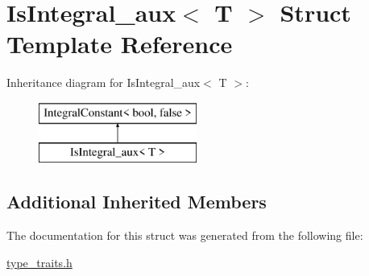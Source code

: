 \hypertarget{struct_is_integral__aux}{}\section{Is\+Integral\+\_\+aux$<$ T $>$ Struct Template Reference}
\label{struct_is_integral__aux}
Inheritance diagram for Is\+Integral\+\_\+aux$<$ T $>$\+:\begin{figure}[H]
\begin{center}
\leavevmode
\includegraphics[height=2.000000cm]{struct_is_integral__aux}
\end{center}
\end{figure}
\subsection*{Additional Inherited Members}


The documentation for this struct was generated from the following file\+:\begin{DoxyCompactItemize}
\item 
\hyperlink{type__traits_8h}{type\+\_\+traits.\+h}\end{DoxyCompactItemize}
